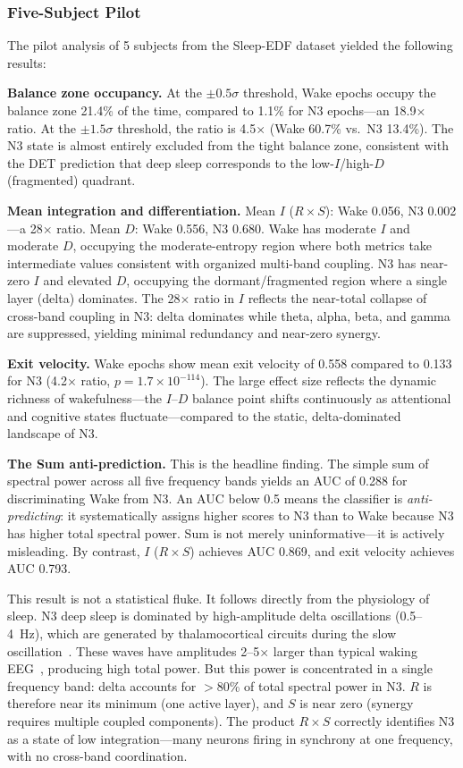\documentclass[12pt,a4paper]{article}
\begin{document}
\subsubsection{Five-Subject Pilot}

The pilot analysis of 5 subjects from the Sleep-EDF dataset yielded the following results:

\textbf{Balance zone occupancy.} At the $\pm 0.5\sigma$ threshold, Wake epochs occupy the balance zone 21.4\% of the time, compared to 1.1\% for N3 epochs---an 18.9$\times$ ratio. At the $\pm 1.5\sigma$ threshold, the ratio is 4.5$\times$ (Wake 60.7\% vs.\ N3 13.4\%). The N3 state is almost entirely excluded from the tight balance zone, consistent with the DET prediction that deep sleep corresponds to the low-$I$/high-$D$ (fragmented) quadrant.

\textbf{Mean integration and differentiation.} Mean $I$ ($R \times S$): Wake 0.056, N3 0.002---a 28$\times$ ratio. Mean $D$: Wake 0.556, N3 0.680. Wake has moderate $I$ and moderate $D$, occupying the moderate-entropy region where both metrics take intermediate values consistent with organized multi-band coupling. N3 has near-zero $I$ and elevated $D$, occupying the dormant/fragmented region where a single layer (delta) dominates. The 28$\times$ ratio in $I$ reflects the near-total collapse of cross-band coupling in N3: delta dominates while theta, alpha, beta, and gamma are suppressed, yielding minimal redundancy and near-zero synergy.

\textbf{Exit velocity.} Wake epochs show mean exit velocity of 0.558 compared to 0.133 for N3 (4.2$\times$ ratio, $p = 1.7 \times 10^{-114}$). The large effect size reflects the dynamic richness of wakefulness---the $I$--$D$ balance point shifts continuously as attentional and cognitive states fluctuate---compared to the static, delta-dominated landscape of N3.

\textbf{The Sum anti-prediction.} This is the headline finding. The simple sum of spectral power across all five frequency bands yields an AUC of 0.288 for discriminating Wake from N3. An AUC below 0.5 means the classifier is \emph{anti-predicting}: it systematically assigns higher scores to N3 than to Wake because N3 has higher total spectral power. Sum is not merely uninformative---it is actively misleading. By contrast, $I$ ($R \times S$) achieves AUC 0.869, and exit velocity achieves AUC 0.793.

This result is not a statistical fluke. It follows directly from the physiology of sleep. N3 deep sleep is dominated by high-amplitude delta oscillations (0.5--4~Hz), which are generated by thalamocortical circuits during the slow oscillation~\cite{massimini2005}. These waves have amplitudes 2--5$\times$ larger than typical waking EEG~\cite{niedermeyer2005}, producing high total power. But this power is concentrated in a single frequency band: delta accounts for $>$80\% of total spectral power in N3. $R$ is therefore near its minimum (one active layer), and $S$ is near zero (synergy requires multiple coupled components). The product $R \times S$ correctly identifies N3 as a state of low integration---many neurons firing in synchrony at one frequency, with no cross-band coordination.
\end{document}
